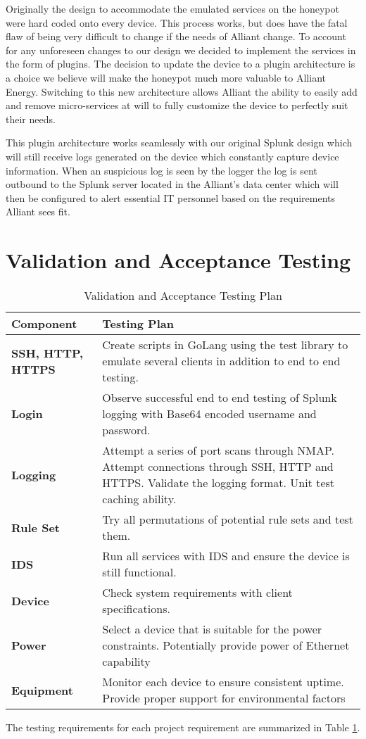 Originally the design to accommodate the emulated services on the honeypot were hard coded onto every device. This process works, but does have the fatal flaw of being very difficult to change if the needs of Alliant change.  To account for any unforeseen changes to our design we decided to implement the services in the form of plugins. The decision to update the device to a plugin architecture is a choice we believe will make the honeypot much more valuable to Alliant Energy.  Switching to this new architecture allows Alliant the ability to easily add and remove micro-services at will to fully customize the device to perfectly suit their needs.

This plugin architecture works seamlessly with our original Splunk design which will still receive logs generated on the device which constantly capture device information. When an suspicious log is seen by the logger the log is sent outbound to the Splunk server located in the Alliant's data center which will then be configured to alert essential IT personnel based on the requirements Alliant sees fit.
\section{Validation and Acceptance Testing}


\begin{table}
\renewcommand{\arraystretch}{1.5}
\centering
\begin{tabular}{l | p{10cm}}
\textup{\Large {\bf Component}} & \textup{\Large {\bf Testing Plan}} \\
\hline \hline
\textbf{SSH, HTTP, HTTPS} & Create scripts in GoLang using the test library to emulate several clients in addition to end to end testing. \\
\textbf{Login} & Observe successful end to end testing of Splunk logging with Base64 encoded username and password.\\
\textbf{Logging} & Attempt a series of port scans through NMAP. Attempt connections through SSH, HTTP and HTTPS. Validate the logging format. Unit test caching ability.  \\
\textbf{Rule Set} & Try all permutations of potential rule sets and test them. \\
\textbf{IDS} & Run all services with IDS and ensure the device is still functional. \\
\textbf{Device} & Check system requirements with client specifications. \\
\textbf{Power} & Select a device that is suitable for the power constraints.  Potentially provide power of Ethernet capability \\
\textbf{Equipment} & Monitor each device to ensure consistent uptime. Provide proper support for environmental factors\\
\end{tabular}
\caption{Validation and Acceptance Testing Plan}
\label{table:vatest}
\end{table}

The testing requirements for each project requirement are summarized in
Table \ref{table:vatest}.

